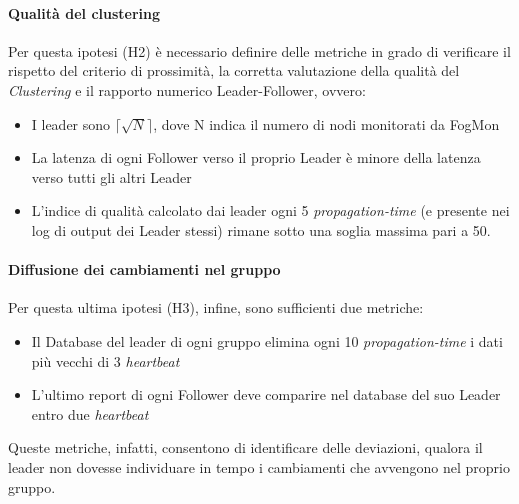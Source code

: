     
    \paragraph{Qualità del clustering} 
    Per questa ipotesi (H2) è necessario definire delle metriche in grado di verificare il rispetto del criterio di prossimità, la corretta valutazione della qualità del \textit{Clustering} e il rapporto numerico Leader-Follower, ovvero:
    \begin{itemize}
        \item I leader sono $\lceil\sqrt{N}\rceil$, dove N indica il numero di nodi monitorati da FogMon
        \item La latenza di ogni Follower verso il proprio Leader è minore della latenza verso tutti gli altri Leader
        \item L'indice di qualità calcolato dai leader ogni 5 \textit{propagation-time} (e presente nei log di output dei Leader stessi) rimane sotto una soglia massima pari a 50.
    \end{itemize}
    
    \paragraph{Diffusione dei cambiamenti nel gruppo}
    Per questa ultima ipotesi (H3), infine, sono sufficienti due metriche:
    \begin{itemize}
        \item Il Database del leader di ogni gruppo elimina ogni 10 \textit{propagation-time} i dati più vecchi di 3 \textit{heartbeat}
        \item L'ultimo report di ogni Follower deve comparire nel database del suo Leader entro due \textit{heartbeat}
    \end{itemize}
    Queste metriche, infatti, consentono di identificare delle deviazioni, qualora il leader non dovesse individuare in tempo i cambiamenti che avvengono nel proprio gruppo.

